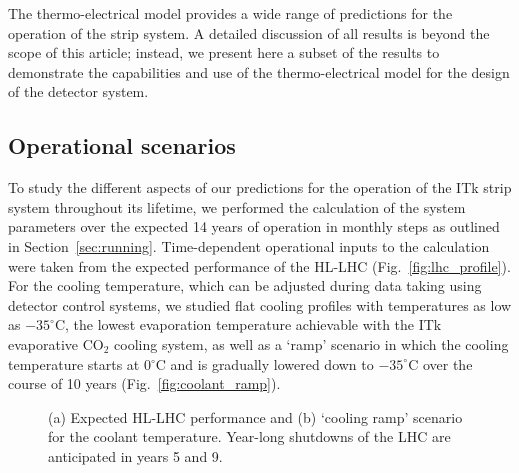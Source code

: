 
The thermo-electrical model provides a wide range of predictions for the operation of the strip system. A detailed discussion of all results is beyond the scope of this article; instead, we present here a subset of the results to demonstrate the capabilities and use of the thermo-electrical model for the design of the detector system.

\subsection{Operational scenarios}\label{sec:opscenarios}
To study the different aspects of our predictions for the operation of the ITk strip system throughout its lifetime, we performed the calculation of the system parameters over the expected 14 years of operation in monthly steps as outlined in Section~\ref{sec:running}. Time-dependent operational inputs to the calculation were taken from the expected performance of the HL-LHC (Fig.~\ref{fig:lhc_profile}). For the cooling temperature, which can be adjusted during data taking using detector control systems, we studied flat cooling profiles with temperatures as low as $-35^\circ$C, the lowest evaporation temperature achievable with the ITk evaporative CO$_2$ cooling system, as well as a `ramp' scenario in which the cooling temperature starts at 0$^\circ$C and is gradually lowered down to $-35^\circ$C over the course of 10 years (Fig.~\ref{fig:coolant_ramp}).

\begin{figure}[ht]
\centering
{}\quad\quad
{}
\caption{(a) Expected HL-LHC performance and (b) `cooling ramp' scenario for the coolant temperature. Year-long shutdowns of the LHC are anticipated in years 5 and 9.}
\label{fig:opscenarios}
\end{figure}

